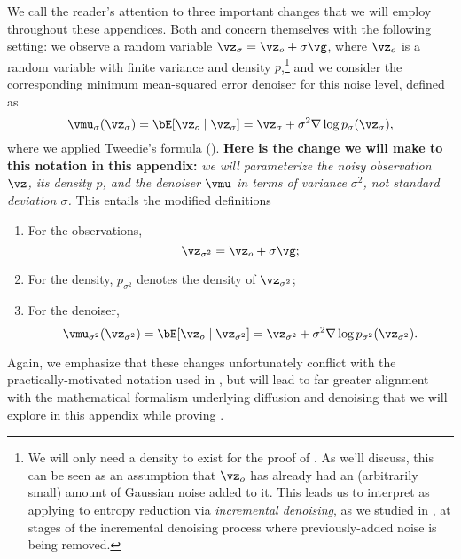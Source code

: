 \documentclass[../../book-main.tex]{subfiles}
\begin{document}
We call the reader's attention to three important changes that we will employ
throughout these appendices. Both  and
 concern themselves with the following
setting:
we observe
a random variable $\vz_{\sigma} = \vz_o + \sigma \vg$, where $\vz_o$ is a random
variable with finite variance and density $p$,\footnote{We will only need
a density to exist for the proof of . As
we'll discuss, this can be seen as an assumption that $\vz_o$ has already had an
(arbitrarily small) amount of Gaussian noise added to it. This leads us to
interpret  as applying to entropy
reduction via \textit{incremental denoising}, as we studied in
, at stages of the incremental denoising process where
previously-added noise is being removed.} and we consider the corresponding
minimum mean-squared error denoiser for this noise level, defined as
\begin{equation*}
  \vmu_{\sigma}(\vz_{\sigma}) = \bE[ \vz_o \mid \vz_{\sigma}
  ] = \vz_{\sigma}
  + \sigma^2 \nabla \log p_{\sigma}(\vz_{\sigma}),
\end{equation*}
where we applied Tweedie's formula ().
\textbf{Here is the change we will make to this notation in this appendix:}
\textit{we will parameterize the noisy observation $\vz$, its density $p$, and
the denoiser $\vmu$ in terms of variance $\sigma^2$, not standard deviation
$\sigma$.} 
This entails the modified definitions
\begin{enumerate}[label={\arabic*.}]
  \item For the observations,
    \begin{equation*}
      \vz_{\sigma^2} = \vz_o + \sigma \vg;
    \end{equation*}
  \item For the density, $p_{\sigma^2}$ denotes the density of $\vz_{\sigma^2}$;
  \item For the denoiser,
    \begin{equation}\label{eq:appendix-mmse-denoiser}
      \vmu_{\sigma^2}(\vz_{\sigma^2}) = \bE[ \vz_o \mid \vz_{\sigma^2}
      ] = \vz_{\sigma^2}
      + \sigma^2 \nabla \log p_{\sigma^2}(\vz_{\sigma^2}).
    \end{equation}
\end{enumerate}
Again, we emphasize that these changes unfortunately conflict with the
practically-motivated notation used in , but will lead to
far greater alignment with the mathematical formalism underlying diffusion and
denoising that we will explore in this appendix while proving
.
\end{document}
